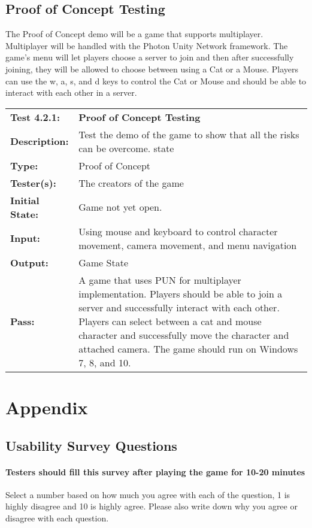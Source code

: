 \documentclass[12pt, titlepage]{article}
\begin{document}
\subsection{Proof of Concept Testing}
The Proof of Concept demo will be a game that supports multiplayer. Multiplayer will be handled with the Photon Unity Network framework. 
The game's menu will let players choose a server to join and then after successfully joining, they will be allowed to choose between using a Cat or a Mouse.
Players can use the w, a, s, and d keys to control the Cat or Mouse and should be able to interact with each other in a server.

\begin{mdframed}[linewidth=1pt]
\begin{tabularx}{\textwidth}{@{}p{3cm}X@{}}
{\bf Test 4.2.1:} & {\bf Proof of Concept Testing}\\[\baselineskip]
{\bf Description:} & Test the demo of the game to show that all the risks can be overcome. state\\[0.5\baselineskip]
{\bf Type:} & Proof of Concept\\[0.5\baselineskip]
{\bf Tester(s):} & The creators of the game\\[0.5\baselineskip]
{\bf Initial State:} & Game not yet open.\\[0.5\baselineskip]
{\bf Input:} & Using mouse and keyboard to control character movement, camera movement, and menu navigation\\[0.5\baselineskip]
{\bf Output:} & Game State\\[0.5\baselineskip]
{\bf Pass:} & A game that uses PUN for multiplayer implementation. Players should be able to join a server and successfully interact with each other. Players can select between a cat and mouse character and successfully move the character and attached camera. The game should run on Windows 7, 8, and 10.
\end{tabularx}
\end{mdframed}


\newpage
\section{Appendix}

\subsection{Usability Survey Questions}
\paragraph{Testers should fill this survey after playing the game for 10-20 minutes}
Select a number based on how much you agree with each of the question, 1 is highly disagree and 10 is highly agree. Please also write down why you agree or disagree with each question.
\end{document}
